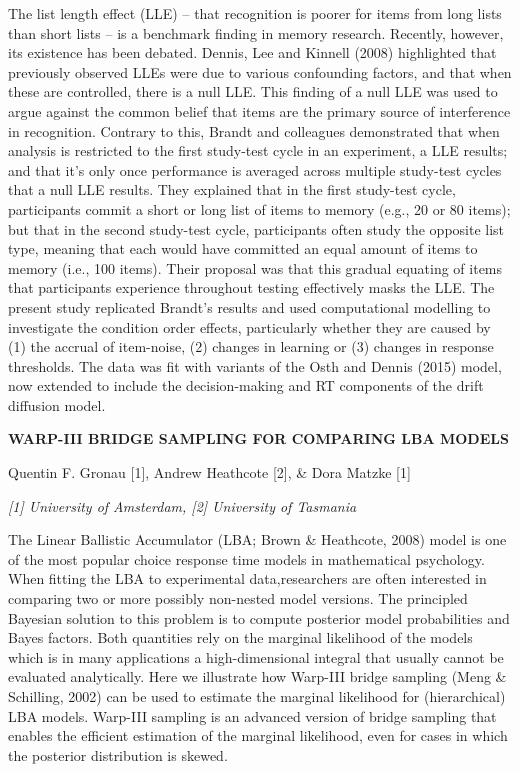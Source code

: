 \documentclass[]{article}
\begin{document}
The list length effect (LLE) -- that recognition is poorer for items
from long lists than short lists -- is a benchmark finding in memory
research. Recently, however, its existence has been debated. Dennis, Lee
and Kinnell (2008) highlighted that previously observed LLEs were due to
various confounding factors, and that when these are controlled, there
is a null LLE. This finding of a null LLE was used to argue against the
common belief that items are the primary source of interference in
recognition. Contrary to this, Brandt and colleagues demonstrated that
when analysis is restricted to the first study-test cycle in an
experiment, a LLE results; and that it's only once performance is
averaged across multiple study-test cycles that a null LLE results. They
explained that in the first study-test cycle, participants commit a
short or long list of items to memory (e.g., 20 or 80 items); but that
in the second study-test cycle, participants often study the opposite
list type, meaning that each would have committed an equal amount of
items to memory (i.e., 100 items). Their proposal was that this gradual
equating of items that participants experience throughout testing
effectively masks the LLE. The present study replicated Brandt's results
and used computational modelling to investigate the condition order
effects, particularly whether they are caused by (1) the accrual of
item-noise, (2) changes in learning or (3) changes in response
thresholds. The data was fit with variants of the Osth and Dennis (2015)
model, now extended to include the decision-making and RT components of
the drift diffusion model.

\textbf{WARP-III BRIDGE SAMPLING FOR COMPARING LBA MODELS}

Quentin F. Gronau {[}1{]}, Andrew Heathcote {[}2{]}, \& Dora Matzke
{[}1{]}

\emph{{[}1{]} University of Amsterdam, {[}2{]} University of Tasmania}

The Linear Ballistic Accumulator (LBA; Brown \& Heathcote, 2008) model
is one of the most popular choice response time models in mathematical
psychology. When fitting the LBA to experimental data,researchers are
often interested in comparing two or more possibly non-nested model
versions. The principled Bayesian solution to this problem is to compute
posterior model probabilities and Bayes factors. Both quantities rely on
the marginal likelihood of the models which is in many applications a
high-dimensional integral that usually cannot be evaluated analytically.
Here we illustrate how Warp-III bridge sampling (Meng \& Schilling,
2002) can be used to estimate the marginal likelihood for (hierarchical)
LBA models. Warp-III sampling is an advanced version of bridge sampling
that enables the efficient estimation of the marginal likelihood, even
for cases in which the posterior distribution is skewed.
\end{document}
